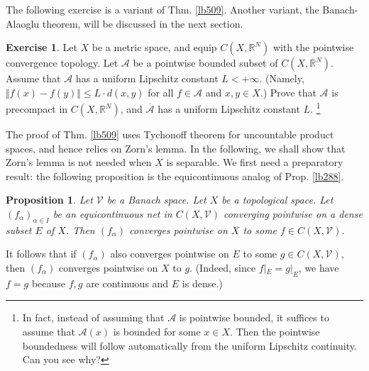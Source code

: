 \documentclass[12pt,b5paper,notitlepage]{article}
\theoremstyle{definition}
\newtheorem{exe}[df]{Exercise}
\newtheorem{rem}[df]{Remark}
\theoremstyle{plain}
\newtheorem{pp}[df]{Proposition}
\newcommand{\mc}{\mathcal}
\newcommand{\ovl}{\overline}
\newcommand{\scr}{\mathscr}
\newcommand{\Rbb}{\mathbb R}
\newcommand{\Cl}{\mathrm{Cl}}
\numberwithin{equation}{section}
\begin{document}
\begin{comment}
\begin{rem}
In the above theorem, one can also prove that $\scr A$ is precompact without using Cor. \ref{lb508}: As in the above proof, we have $\scr A\subset S=\prod_{x\in X}K_x$ where $S$ is compact. So $\Cl_S(\scr A)$ is compact. Thus $\scr A$ is precompact in $C(X,Y)$ if we can prove that $\Cl_S(\scr A)$ is a subset of $C(X,Y)$. But this follows immediately from Cor. \ref{lb303}, or from the last paragraph of the above proof.
\end{rem}
\end{comment}


The following exercise is a variant of Thm. \ref{lb509}. Another variant, the Banach-Alaoglu theorem, will be discussed in the next section.



\begin{exe}\label{lb536}
Let $X$ be a metric space, and equip $C(X,\Rbb^N)$ with the pointwise convergence topology. Let $\scr A$ be a pointwise bounded subset of $C(X,\Rbb^N)$. Assume that $\scr A$ has a uniform Lipschitz constant $L<+\infty$. (Namely, $\Vert f(x)-f(y)\Vert\leq L\cdot d(x,y)$ for all $f\in\scr A$ and $x,y\in X$.) Prove that $\scr A$ is precompact in $C(X,\Rbb^N)$, and $\ovl{\scr A}$ has a uniform Lipschitz constant $L$. \footnote{In fact, instead of assuming that $\scr A$ is pointwise bounded, it suffices to assume that $\scr A(x)$ is bounded for some $x\in X$. Then the pointwise boundedness will follow automatically from the uniform Lipschitz continuity. Can you see why?}
\end{exe}



The proof of Thm. \ref{lb509} uses Tychonoff theorem for uncountable product spaces, and hence relies on Zorn's lemma. In the following, we shall show that Zorn's lemma is not needed when $X$ is separable. We first need a preparatory result: the following proposition is the equicontinuous analog of Prop. \ref{lb288}.



\begin{pp}\label{lb511}
Let $\mc V$ be a Banach space. Let $X$ be a topological space. Let $(f_\alpha)_{\alpha\in I}$ be an equicontinuous net in $C(X,\mc V)$ converging pointwise on a dense subset $E$ of $X$. Then $(f_\alpha)$ converges pointwise on $X$ to some $f\in C(X,\mc V)$.
\end{pp}

It follows that if $(f_\alpha)$ also converges pointwise on $E$ to some $g\in C(X,\mc V)$, then $(f_\alpha)$ converges pointwise on $X$ to $g$. (Indeed, since $f|_E=g|_E$, we have $f=g$ because $f,g$ are continuous and $E$ is dense.)  
\end{document}
